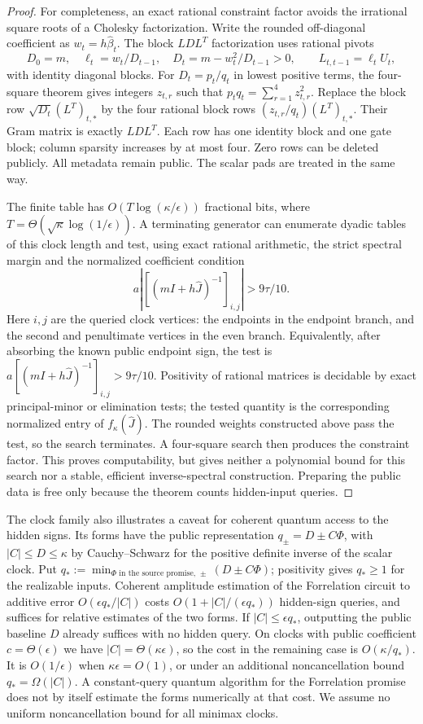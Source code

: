 \begin{proof}
For completeness, an exact rational constraint factor avoids the
irrational square roots of a Cholesky factorization. Write the rounded off-diagonal coefficient as
$w_t=h\widehat\beta_t$. The block $LDL^T$ factorization uses rational
pivots
\[
 D_0=m,\quad \ell_t=w_t/D_{t-1},\quad
 D_t=m-w_t^2/D_{t-1}>0,
 \qquad L_{t,t-1}=\ell_tU_t,
\]
with identity diagonal blocks. For $D_t=p_t/q_t$ in lowest positive
terms, the four-square theorem gives integers $z_{t,r}$ such that
$p_tq_t=\sum_{r=1}^4z_{t,r}^2$. Replace the block row
$\sqrt{D_t}(L^T)_{t,*}$ by the four rational block rows
$(z_{t,r}/q_t)(L^T)_{t,*}$. Their Gram matrix is exactly $LDL^T$.
Each row has one identity block and one gate block; column sparsity
increases by at most four. Zero rows can be deleted publicly. All
metadata remain public. The scalar pads are treated in the same way.

The finite table has $O(T\log(\kappa/\epsilon))$ fractional bits,
where $T=\Theta(\sqrt\kappa\log(1/\epsilon))$.
A terminating generator can enumerate dyadic tables of this clock
length and test, using exact rational arithmetic, the strict spectral
margin and the normalized coefficient condition
\[
        a\left|[(mI+h\widehat J)^{-1}]_{i,j}\right|>9\tau/10.
\]
Here $i,j$ are the queried clock vertices: the endpoints in the endpoint
branch, and the second and penultimate vertices in the even branch.
Equivalently, after absorbing the known public endpoint sign, the test is
$a[(mI+h\widehat J)^{-1}]_{i,j}>9\tau/10$.
Positivity of rational matrices is decidable by exact principal-minor or
elimination tests; the tested quantity is the corresponding normalized
entry of $f_\kappa(\widehat J)$. The rounded weights constructed above
pass the test, so the search terminates. A four-square search then
produces the constraint factor. This proves computability, but gives
neither a polynomial bound for this search nor a stable, efficient
inverse-spectral construction. Preparing the public data is free only
because the theorem counts hidden-input queries.
\end{proof}

The clock family also illustrates a caveat for coherent quantum access
to the hidden signs. Its forms have the public representation
$q_\pm=D\pm C\Phi$, with $|C|\leq D\leq\kappa$ by Cauchy--Schwarz for
the positive definite inverse of the scalar clock. Put
$q_*:=\min_{\Phi\text{ in the source promise},\,\pm}(D\pm C\Phi)$;
positivity gives $q_*\geq1$ for the realizable inputs. Coherent
amplitude estimation of the Forrelation circuit to additive error
$O(\epsilon q_*/|C|)$ costs
$O(1+|C|/(\epsilon q_*))$ hidden-sign queries, and suffices for
relative estimates of the two forms. If $|C|\leq\epsilon q_*$,
outputting the public baseline $D$ already suffices with no hidden
query. On clocks with public coefficient $c=\Theta(\epsilon)$ we have
$|C|=\Theta(\kappa\epsilon)$, so the cost in the remaining case is
$O(\kappa/q_*)$. It is $O(1/\epsilon)$ when
$\kappa\epsilon=O(1)$, or under an additional noncancellation
bound $q_*=\Omega(|C|)$. A constant-query quantum algorithm for the
Forrelation promise does not by itself estimate the forms numerically at
that cost. We assume no uniform noncancellation bound for all minimax
clocks.

